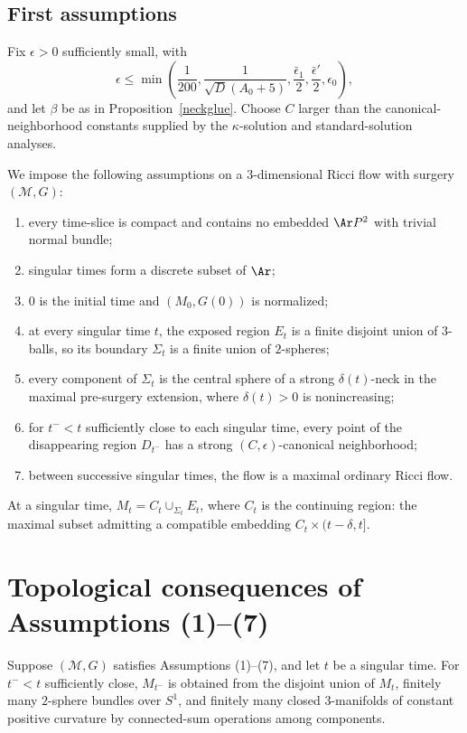 \subsection{First assumptions}
\label{firstassumpt}

Fix $\epsilon>0$ sufficiently small, with
\[
  \epsilon\leq\min\left(\frac1{200},\frac1{\sqrt D(A_0+5)},
  \frac{\bar\epsilon_1}2,\frac{\bar\epsilon'}2,\epsilon_0\right),
\]
and let $\beta$ be as in Proposition~\ref{neckglue}. Choose
$C$ larger than the canonical-neighborhood constants supplied by the
$\kappa$-solution and standard-solution analyses.

We impose the following assumptions on a $3$-dimensional Ricci flow with
surgery $({\mathcal M},G)$:
\begin{enumerate}
\item[(1)] every time-slice is compact and contains no embedded $\Ar P^2$ with
trivial normal bundle;
\item[(2)] singular times form a discrete subset of $\Ar$;
\item[(3)] $0$ is the initial time and $(M_0,G(0))$ is normalized;
\item[(4)] at every singular time $t$, the exposed region $E_t$ is a finite
disjoint union of $3$-balls, so its boundary $\Sigma_t$ is a finite union of
$2$-spheres;
\item[(5)] every component of $\Sigma_t$ is the central sphere of a strong
$\delta(t)$-neck in the maximal pre-surgery extension, where $\delta(t)>0$ is
nonincreasing;
\item[(6)] for $t^-<t$ sufficiently close to each singular time, every point
of the disappearing region $D_{t^-}$ has a strong $(C,\epsilon)$-canonical
neighborhood;
\item[(7)] between successive singular times, the flow is a maximal ordinary
Ricci flow.
\end{enumerate}
At a singular time, $M_t=C_t\cup_{\Sigma_t}E_t$, where $C_t$ is the continuing
region: the maximal subset admitting a compatible embedding
$C_t\times(t-\delta,t]$.

\section{Topological consequences of Assumptions (1)--(7)}

\begin{proposition}
\label{prop:surgery-topological-type}
\label{surgerytoptype}
Suppose $({\mathcal M},G)$ satisfies Assumptions (1)--(7), and let $t$ be a
singular time. For $t^-<t$ sufficiently close, $M_{t^-}$ is obtained from the
disjoint union of $M_t$, finitely many $2$-sphere bundles over $S^1$, and finitely
many closed $3$-manifolds of constant positive curvature by connected-sum
operations among components.
\end{proposition}

